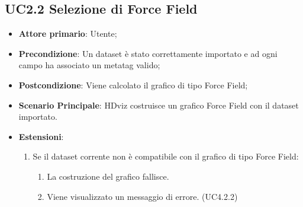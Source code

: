 \subsection{UC2.2 Selezione di Force Field}
\label{ssub:UC2.2}
\begin{itemize}

    \item \textbf{Attore primario}: Utente;

    \item \textbf{Precondizione}:   Un dataset è stato correttamente importato e ad ogni campo ha associato
                                    un metatag valido;

    \item \textbf{Postcondizione}:  Viene calcolato il grafico di tipo Force Field;
	
	\item \textbf{Scenario Principale}: HDviz costruisce un grafico Force Field con il dataset importato.
	\item \textbf{Estensioni}:
	\begin{enumerate}
		\item Se il dataset corrente non è compatibile con il grafico di tipo Force Field:
		\begin{enumerate}
			\item La costruzione del grafico fallisce.
			\item Viene visualizzato un messaggio di errore. (UC4.2.2)
		\end{enumerate}
	\end{enumerate}
\end{itemize}


